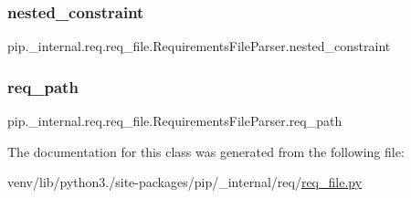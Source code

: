 \subsubsection{\texorpdfstring{nested\+\_\+constraint}{nested\_constraint}}
{\footnotesize\ttfamily pip.\+\_\+internal.\+req.\+req\+\_\+file.\+Requirements\+File\+Parser.\+nested\+\_\+constraint\hspace{0.3cm}{\ttfamily [static]}}

\mbox{\label{classpip_1_1__internal_1_1req_1_1req__file_1_1RequirementsFileParser_a8520ef39bdabc5d0474f044f0ebbf0f9}} 
\subsubsection{\texorpdfstring{req\+\_\+path}{req\_path}}
{\footnotesize\ttfamily pip.\+\_\+internal.\+req.\+req\+\_\+file.\+Requirements\+File\+Parser.\+req\+\_\+path\hspace{0.3cm}{\ttfamily [static]}}



The documentation for this class was generated from the following file\+:\begin{DoxyCompactItemize}
\item 
venv/lib/python3./site-\/packages/pip/\+\_\+internal/req/\hyperlink{req__file_8py}{req\+\_\+file.\+py}\end{DoxyCompactItemize}
